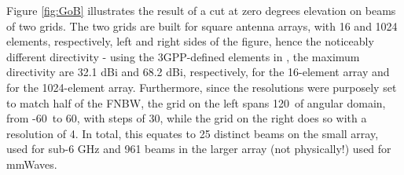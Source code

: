 Figure \ref{fig:GoB} illustrates the result of a cut at zero degrees elevation on beams of two grids. The two grids are built for square antenna arrays, with 16 and 1024 elements, respectively, left and right sides of the figure, hence the noticeably different directivity - using the 3GPP-defined elements in \cite{3gpp-antennas}, the maximum directivity are 32.1 dBi and 68.2 dBi, respectively, for the 16-element array and for the 1024-element array. Furthermore, since the resolutions were purposely set to match half of the \ac{FNBW}, the grid on the left spans 120\textdegree \ of angular domain, from -60\textdegree \ to 60\textdegree, with steps of 30\textdegree, while the grid on the right does so with a resolution of 4\textdegree. In total, this equates to 25 distinct beams on the small array, used for sub-6 GHz and 961 beams in the larger array (not physically!) used for mmWaves.




